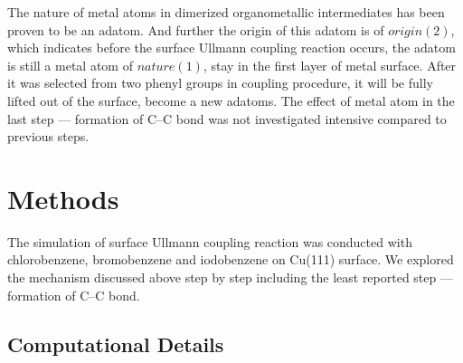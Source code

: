 \documentclass[%
 reprint,
 amsmath,amssymb,
 aps,
prb,
]{revtex4-2}
\begin{document}
The nature of metal atoms in dimerized organometallic intermediates has been proven to be an adatom. And further the origin of this adatom is of $origin(2)$, which indicates before the surface Ullmann coupling reaction occurs, the adatom is still a metal atom of $nature(1)$, stay in the first layer of metal surface. After it was selected from two phenyl groups in coupling procedure, it will be fully lifted out of the surface, become a new adatoms. The effect of metal atom in the last step --- formation of C--C bond was not investigated intensive compared to previous steps.



\section{Methods}

The simulation of surface Ullmann coupling reaction was conducted with chlorobenzene, bromobenzene and iodobenzene on Cu(111) surface. We explored the mechanism discussed above step by step including the least reported step --- formation of C--C bond.

\subsection{Computational Details}
\end{document}

